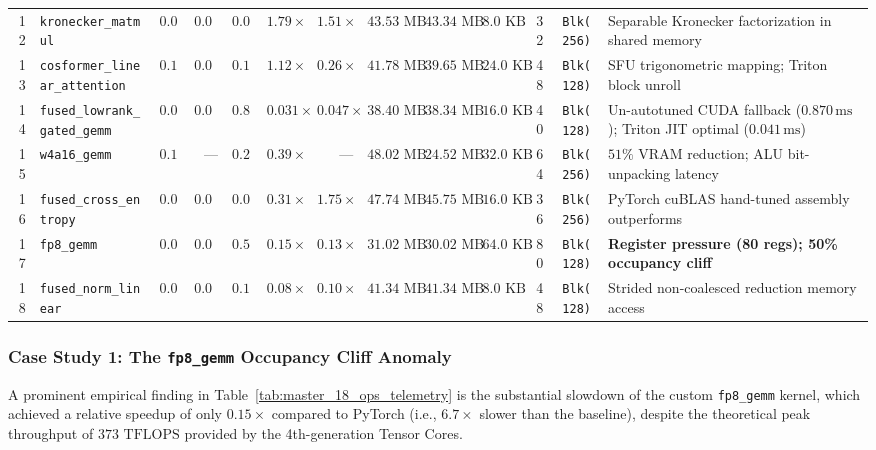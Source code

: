 \begin{table}[t]
{\begin{tabular}{rlrrrrrrrcccp{4.2cm}}
12 & \texttt{kronecker\_matmul}            & $0.030$  & $0.026$  & $0.017$ & $1.79\times$            & $1.51\times$ & $43.53\text{ MB}$ & $43.34\text{ MB}$ & $8.0\text{ KB}$  & 32 & \texttt{Blk(256)}  & Separable Kronecker factorization in shared memory \\
13 & \texttt{cosformer\_linear\_attention} & $0.118$  & $0.027$  & $0.106$ & $1.12\times$            & $0.26\times$ & $41.78\text{ MB}$ & $39.65\text{ MB}$ & $24.0\text{ KB}$ & 48 & \texttt{Blk(128)}  & SFU trigonometric mapping; Triton block unroll \\
\midrule
14 & \texttt{fused\_lowrank\_gated\_gemm}  & $0.027$  & $0.041$  & $0.870$ & $0.031\times$           & $0.047\times$ & $38.40\text{ MB}$ & $38.34\text{ MB}$ & $16.0\text{ KB}$ & 40 & \texttt{Blk(128)}  & Un-autotuned CUDA fallback ($0.870\,\text{ms}$); Triton JIT optimal ($0.041\,\text{ms}$) \\
15 & \texttt{w4a16\_gemm}                  & $0.104$  & ---      & $0.266$ & $0.39\times$            & ---          & $48.02\text{ MB}$ & $24.52\text{ MB}$ & $32.0\text{ KB}$ & 64 & \texttt{Blk(256)}  & $51\%$ VRAM reduction; ALU bit-unpacking latency \\
16 & \texttt{fused\_cross\_entropy}        & $0.012$  & $0.065$  & $0.037$ & $0.31\times$            & $1.75\times$ & $47.74\text{ MB}$ & $45.75\text{ MB}$ & $16.0\text{ KB}$ & 36 & \texttt{Blk(256)}  & PyTorch cuBLAS hand-tuned assembly outperforms \\
17 & \texttt{fp8\_gemm}                    & $0.078$  & $0.068$  & $0.507$ & $0.15\times$            & $0.13\times$ & $31.02\text{ MB}$ & $30.02\text{ MB}$ & $64.0\text{ KB}$ & 80 & \texttt{Blk(128)}  & \textbf{Register pressure (80 regs); 50\% occupancy cliff} \\
18 & \texttt{fused\_norm\_linear}          & $0.015$  & $0.019$  & $0.195$ & $0.08\times$            & $0.10\times$ & $41.34\text{ MB}$ & $41.34\text{ MB}$ & $8.0\text{ KB}$  & 48 & \texttt{Blk(128)}  & Strided non-coalesced reduction memory access \\
\bottomrule
\end{tabular}%
}
\end{table}

\subsubsection{Case Study 1: The \texttt{fp8\_gemm} Occupancy Cliff Anomaly}
\label{sec:appendix_case_study_fp8}

A prominent empirical finding in Table~\ref{tab:master_18_ops_telemetry} is the substantial slowdown of the custom \texttt{fp8\_gemm} kernel, which achieved a relative speedup of only \textbf{$0.15\times$} compared to PyTorch (i.e., $6.7\times$ slower than the baseline), despite the theoretical peak throughput of $373\text{ TFLOPS}$ provided by the 4th-generation Tensor Cores.

